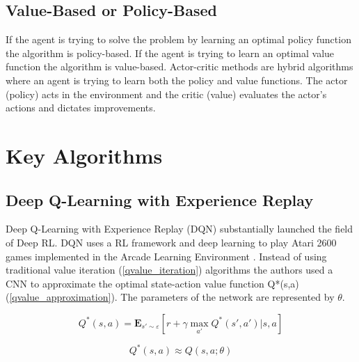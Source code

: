 \documentclass[10pt,journal,compsoc]{IEEEtran}
\begin{document}
\subsection{Value-Based or Policy-Based}
If the agent is trying to solve the problem by learning an optimal policy function the algorithm is policy-based. If the agent is trying to learn an optimal value function the algorithm is value-based. Actor-critic methods are hybrid algorithms where an agent is trying to learn both the policy and value functions. The actor (policy) acts in the environment and the critic (value) evaluates the actor's actions and dictates improvements.

\section{Key Algorithms}
\subsection{Deep Q-Learning with Experience Replay}
Deep Q-Learning with Experience Replay (DQN) \cite{Mnih:DQN} substantially launched the field of Deep RL. DQN uses a RL framework and deep learning to play Atari 2600 games implemented in the Arcade Learning Environment \cite{bellemare2013arcade}. Instead of using traditional value iteration (\ref{qvalue_iteration}) algorithms the authors used a CNN to approximate the optimal state-action value function Q*(s,a) (\ref{qvalue_approximation}). The parameters of the network are represented by \begin{math}\theta\end{math}.

\begin{equation}
\label{qvalue_iteration}
Q^*(s,a) = \mathbf{E}_{s'\sim\varepsilon} [r + \gamma \max_{a'} Q^*(s',a')|s,a]
\end{equation}

\begin{equation}
\label{qvalue_approximation}
Q^*(s,a) \approx Q(s,a;\theta)
\end{equation}
\end{document}
